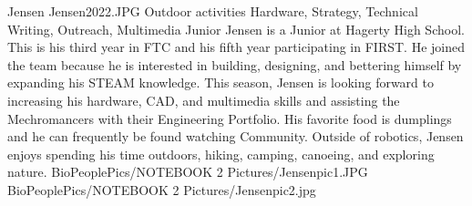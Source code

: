 \insertbio
{Jensen}
{Jensen2022.JPG}
{Outdoor activities}
{Hardware, Strategy, Technical Writing, Outreach, Multimedia}
{Junior}
{
Jensen is a Junior at Hagerty High School. This is his third year in FTC and his fifth year participating in FIRST. He joined the team because he is interested in building, designing, and bettering himself by expanding his STEAM knowledge. This season, Jensen is looking forward to increasing his hardware, CAD, and multimedia skills and assisting the Mechromancers with their Engineering Portfolio. His favorite food is dumplings and he can frequently be found watching Community. Outside of robotics, Jensen enjoys spending his time outdoors, hiking, camping, canoeing, and exploring nature. 
}
{BioPeoplePics/NOTEBOOK 2 Pictures/Jensenpic1.JPG}
{BioPeoplePics/NOTEBOOK 2 Pictures/Jensenpic2.jpg}
